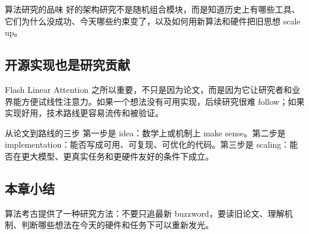\begin{importantbox}{算法研究的品味}
好的架构研究不是随机组合模块，而是知道历史上有哪些工具、它们为什么没成功、今天哪些约束变了，以及如何用新算法和硬件把旧思想 scale up。
\end{importantbox}

\subsection{开源实现也是研究贡献}

Flash Linear Attention 之所以重要，不只是因为论文，而是因为它让研究者和业界能方便试线性注意力。如果一个想法没有可用实现，后续研究很难 follow；如果实现好用，技术路线更容易流传和被验证。

\begin{knowledgebox}{从论文到路线的三步}
第一步是 idea：数学上或机制上 make sense。第二步是 implementation：能否写成可用、可复现、可优化的代码。第三步是 scaling：能否在更大模型、更真实任务和更硬件友好的条件下成立。
\end{knowledgebox}

\subsection{本章小结}

算法考古提供了一种研究方法：不要只追最新 buzzword，要读旧论文、理解机制、判断哪些想法在今天的硬件和任务下可以重新发光。

